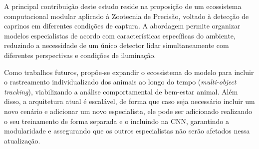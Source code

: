 \documentclass[12pt,fleqn]{article}
\begin{document}

A principal contribuição deste estudo reside na proposição de um ecossistema computacional modular aplicado à Zootecnia de Precisão, voltado à detecção de caprinos em diferentes condições de captura. A abordagem permite organizar modelos especialistas de acordo com características específicas do ambiente, reduzindo a necessidade de um único detector lidar simultaneamente com diferentes perspectivas e condições de iluminação.



Como trabalhos futuros, propõe-se expandir o ecossistema do modelo para incluir o rastreamento individualizado dos animais ao longo do tempo (\textit{multi-object tracking}), viabilizando a análise comportamental de bem-estar animal. Além disso, a arquitetura atual é escalável, de forma que caso seja necessário incluir um novo cenário e adicionar um novo especialista, ele pode ser adicionado realizando o seu treinamento de forma separada e o incluindo na CNN, garantindo a modularidade e assegurando que os outros especialistas não serão afetados nessa atualização.
\end{document}
